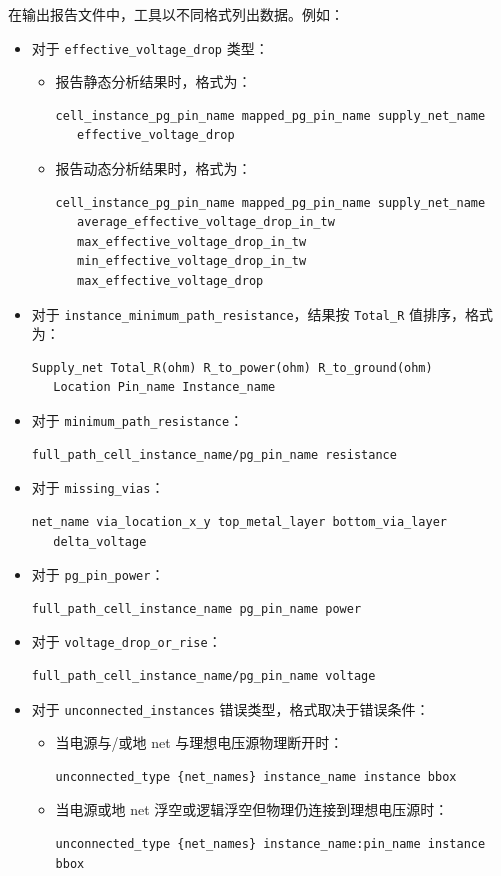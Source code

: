 在输出报告文件中，工具以不同格式列出数据。例如：

\begin{itemize}
  \item 对于 \texttt{effective\_voltage\_drop} 类型：
    \begin{itemize}
      \item 报告静态分析结果时，格式为：
\begin{lstlisting}
cell_instance_pg_pin_name mapped_pg_pin_name supply_net_name
   effective_voltage_drop
\end{lstlisting}
      \item 报告动态分析结果时，格式为：
\begin{lstlisting}
cell_instance_pg_pin_name mapped_pg_pin_name supply_net_name
   average_effective_voltage_drop_in_tw
   max_effective_voltage_drop_in_tw
   min_effective_voltage_drop_in_tw
   max_effective_voltage_drop
\end{lstlisting}
    \end{itemize}
  \item 对于 \texttt{instance\_minimum\_path\_resistance}，结果按 \texttt{Total\_R} 值排序，格式为：
\begin{lstlisting}
Supply_net Total_R(ohm) R_to_power(ohm) R_to_ground(ohm)
   Location Pin_name Instance_name
\end{lstlisting}
  \item 对于 \texttt{minimum\_path\_resistance}：
\begin{lstlisting}
full_path_cell_instance_name/pg_pin_name resistance
\end{lstlisting}
  \item 对于 \texttt{missing\_vias}：
\begin{lstlisting}
net_name via_location_x_y top_metal_layer bottom_via_layer
   delta_voltage
\end{lstlisting}
  \item 对于 \texttt{pg\_pin\_power}：
\begin{lstlisting}
full_path_cell_instance_name pg_pin_name power
\end{lstlisting}
  \item 对于 \texttt{voltage\_drop\_or\_rise}：
\begin{lstlisting}
full_path_cell_instance_name/pg_pin_name voltage
\end{lstlisting}
  \item 对于 \texttt{unconnected\_instances} 错误类型，格式取决于错误条件：
    \begin{itemize}
      \item 当电源与/或地 net 与理想电压源物理断开时：
\begin{lstlisting}
unconnected_type {net_names} instance_name instance bbox
\end{lstlisting}
      \item 当电源或地 net 浮空或逻辑浮空但物理仍连接到理想电压源时：
\begin{lstlisting}
unconnected_type {net_names} instance_name:pin_name instance bbox
\end{lstlisting}
    \end{itemize}
\end{itemize}

